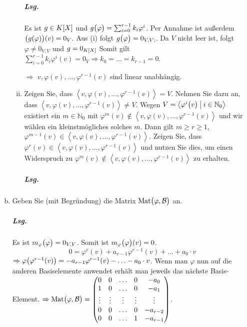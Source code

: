 \documentclass{scrreprt}
\newcommand{\Mat}{\text{Mat}}
\begin{document}
\begin{enumerate}[(a)]
\begin{enumerate}[(i)]
    \subparagraph{Lsg.} Es ist $g \in K\qty[X]$ und
    $g\qty\big(\varphi) = \sum_{i = 0}^{r - 1} k_i\varphi^i$.
    Per Annahme ist außerdem $\qty\big(g(\varphi))(v) = 0_V$.
    Aus (i) folgt $g\qty\big(\varphi) = 0_{V, V;}$.
    Da $V$ nicht leer ist, folgt $\varphi \ne 0_{V, V}$ und
    $g = 0_{K\qty[X]}$
    Somit gilt
    $\sum_{i = 0}^{r - 1} k_i\varphi^i(v) = 0_V \Rightarrow
    k_0 = \ldots = k_{r - 1} = 0$.

    $\Rightarrow$ $v, \varphi(v), \ldots, \varphi^{r - 1}(v)$ sind linear
    unabhängig.

  \item Zeigen Sie, dass
    $\left\langle v, \varphi(v), \ldots, \varphi^{r - 1}(v)\right\rangle = V$.
    Nehmen Sie dazu an, dass
    $\left\langle v, \varphi(v), \ldots, \varphi^{r - 1}(v)\right\rangle \ne V$.
    Wegen $V = \left\langle
      \varphi^i\qty\big(v) \:{\big |}\: i \in \mathbb{N}_0
    \right\rangle$ existiert ein $m \in \mathbb{N}_0$ mit
    $\varphi^m(v) \notin
    \left\langle v, \varphi(v), \ldots, \varphi^{r - 1}(v)\right\rangle$ und wir
    wählen ein kleinstmögliches solches $m$.
    Dann gilt $m \geq r \geq 1$, $\varphi^{m - 1}(v) \in \left\langle
      v, \varphi(v), \ldots, \varphi^{r - 1}(v)
    \right\rangle$.
    Zeigen Sie, dass $\varphi^r(v) \in \left\langle
      v, \varphi(v), \ldots, \varphi^{r - 1}(v)
    \right\rangle$ und nutzen Sie dies, um einen Widerspruch zu
    $\varphi^m(v) \notin \left\langle
      v, \varphi(v), \ldots, \varphi^{r - 1}(v)
    \right\rangle$ zu erhalten.

    \subparagraph{Lsg.}
  \end{enumerate}

\newpage
\item Geben Sie (mit Begründung) die Matrix $\Mat\qty\big(\varphi, \mathcal{B})$
  an.

  \subparagraph{Lsg.} Es ist $m_{\varphi}\qty\big(\varphi) = 0_{V, V}$.
  Somit ist $m_{\varphi}\qty\big(\varphi)(v) = 0$.
  \[
    0 = \varphi^r(v) + a_{r - 1}\varphi^{r - 1}(v) + \ldots + a_0 \cdot v
  \]
  $\Rightarrow \varphi\qty\big(\varphi^{r - 1}(v)) = -a_{r - 1}\varphi^{r - 1}(v) - \ldots - a_0 \cdot v$.
  Wenn man $\varphi$ nun auf die anderen Basiselemente anwendet erhält man
  jeweils das nächste Basis-Element.
  $\Rightarrow \Mat\qty\big(\varphi, \mathcal{B}) = \begin{pmatrix}
    0 & 0 & \ldots & 0 & -a_0 \\
    1 & 0 & \ldots & 0 & -a_1 \\
    \vdots & \vdots & \vdots & \vdots & \vdots \\
    0 & 0 & \ldots & 0 & -a_{r - 2} \\
    0 & 0 & \ldots & 1 & -a_{r - 1}
  \end{pmatrix}$.
\end{enumerate}
\end{document}
